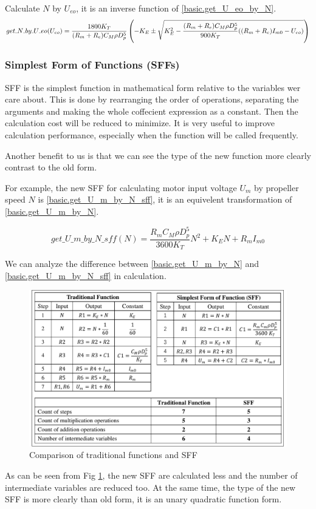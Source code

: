 \documentclass{article} %
\numberwithin{equation}{section} %
\newcommand{\SL}{\rule{.3em}{.3pt}} %
\begin{document}
Calculate $N$ by $U_{eo}$, it is an inverse function of \eqref{basic.get_U_eo_by_N}.
\begin{equation}
get\SL N\SL by\SL U\SL eo (U_{eo}) = \frac{1800 K_T}{(R_m + R_e) C_M \rho D_p^5}
	\left(-K_E\pm \sqrt{K_E^2 - \frac{(R_m + R_e) C_M \rho D_p^5}{900 K_T}
	((R_m + R_e) I_{m0} - U_{eo})}
	\right) \label{basic.get_U_eo_by_N}
\end{equation}


\subsubsection{Simplest Form of Functions (SFFs)}\label{main:basic:sff}
SFF is the simplest function in mathematical form relative to the variables wer care about.
This is done by rearranging the order of operations, separating the arguments and making the whole coffecient expression as a constant.
Then the calculation cost will be reduced to minimize. 
It is very useful to improve calculation performance, especially when the function will be called frequently.

Another benefit to us is that we can see the type of the new function more clearly contrast to the old form.

For example, the new SFF for calculating motor input voltage $U_m$ by propeller speed $N$ is \eqref{basic.get_U_m_by_N_sff}, 
it is an equivelent transformation of \eqref{basic.get_U_m_by_N}.

\begin{equation}
get\_ U\_ m\_ by\_ N\_ sff (N) = \frac{R_m C_M \rho D_p^5}{3600 K_T} N^2 + K_E N + R_m I_{m0} \label{basic.get_U_m_by_N_sff}
\end{equation}

We can analyze the difference between \eqref{basic.get_U_m_by_N} and \eqref{basic.get_U_m_by_N_sff} in calculation. 
\begin{figure}[H]%
\centerline{\includegraphics[width=1.0\textwidth]{fig3_CompareTwoMethods.pdf}}
\caption{Comparison of traditional functions and SFF}
\label{fig:fig3_CompareTwoMethods}
\end{figure}
As can be seen from Fig \ref{fig:fig3_CompareTwoMethods}, the new SFF are calculated less and the number of intermediate variables are reduced too.
At the same time, the type of the new SFF is more clearly than old form, it is an unary quadratic function form.
\end{document}
